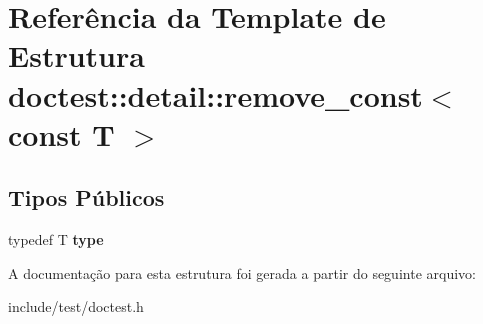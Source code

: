\hypertarget{structdoctest_1_1detail_1_1remove__const_3_01const_01T_01_4}{}\section{Referência da Template de Estrutura doctest\+:\+:detail\+:\+:remove\+\_\+const$<$ const T $>$}
\label{structdoctest_1_1detail_1_1remove__const_3_01const_01T_01_4}
\subsection*{Tipos Públicos}
\begin{DoxyCompactItemize}
\item 
\mbox{\label{structdoctest_1_1detail_1_1remove__const_3_01const_01T_01_4_ab1e642665bafaad4023fba5295290b17}} 
typedef T {\bfseries type}
\end{DoxyCompactItemize}


A documentação para esta estrutura foi gerada a partir do seguinte arquivo\+:\begin{DoxyCompactItemize}
\item 
include/test/doctest.\+h\end{DoxyCompactItemize}
